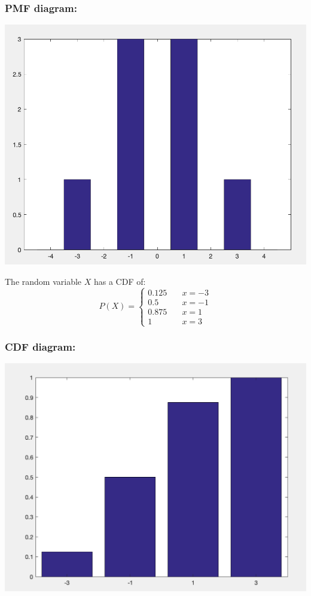 \documentclass[12pt]{article}%
\begin{document}
\subsubsection*{PMF diagram:}
\begin{center}
\includegraphics[scale=0.8]{pmf} \\
\end{center}

The random variable $X$ has a CDF of:
\[ P(X) =
  \begin{cases}
    0.125       	  & \quad x = -3 \\
    0.5  	    	  & \quad x = -1 \\
  	0.875  	    	  & \quad x = 1 \\
    1       		  & \quad x = 3 
  \end{cases}
\]

\subsubsection*{CDF diagram:}
\begin{center}
\includegraphics[scale=0.8]{cdf} \\
\end{center}
\newpage
\end{document}
